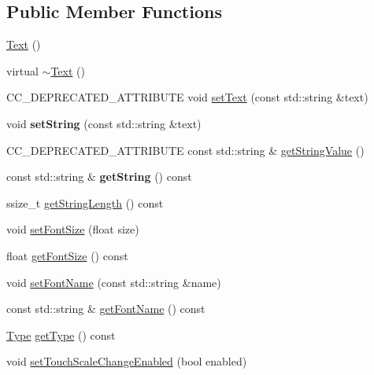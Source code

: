 \subsection*{Public Member Functions}
\begin{DoxyCompactItemize}
\item 
\hyperlink{classui_1_1Text_ab3e26143fccc52699bcc5149cae852bc}{Text} ()
\item 
virtual \hyperlink{classui_1_1Text_a2d49e5c280e205125b149f7777ae30c7}{$\sim$\+Text} ()
\item 
C\+C\+\_\+\+D\+E\+P\+R\+E\+C\+A\+T\+E\+D\+\_\+\+A\+T\+T\+R\+I\+B\+U\+TE void \hyperlink{classui_1_1Text_a2c5da36c598db2803c5fd0a30cc8c7c9}{set\+Text} (const std\+::string \&text)
\item 
\mbox{\label{classui_1_1Text_ad564520019239edbb2785f37e33fb4b6}} 
void {\bfseries set\+String} (const std\+::string \&text)
\item 
C\+C\+\_\+\+D\+E\+P\+R\+E\+C\+A\+T\+E\+D\+\_\+\+A\+T\+T\+R\+I\+B\+U\+TE const std\+::string \& \hyperlink{classui_1_1Text_af96f13417b0e3369f241917a6ea52b9e}{get\+String\+Value} ()
\item 
\mbox{\label{classui_1_1Text_aa1b3ce171bf86d1704f92b6f6daf81ba}} 
const std\+::string \& {\bfseries get\+String} () const
\item 
ssize\+\_\+t \hyperlink{classui_1_1Text_ae73702da851f182ad223f8e091d5a2cf}{get\+String\+Length} () const
\item 
void \hyperlink{classui_1_1Text_ab084a5776c3dd3c7aef1b88b2c06beb6}{set\+Font\+Size} (float size)
\item 
float \hyperlink{classui_1_1Text_a6e799a9b0ba6f88e704eea12599d3d5c}{get\+Font\+Size} () const
\item 
void \hyperlink{classui_1_1Text_ac8fe6b63731d42503f6bb73b00d3d40d}{set\+Font\+Name} (const std\+::string \&name)
\item 
const std\+::string \& \hyperlink{classui_1_1Text_acaddbad02a8d58bba6af322c09e05beb}{get\+Font\+Name} () const
\item 
\hyperlink{classui_1_1Text_a66074a2bf4b155f85115f944c6ff01ed}{Type} \hyperlink{classui_1_1Text_a4f95c69fb9ea4c6f8e0409cc86d804cb}{get\+Type} () const
\item 
void \hyperlink{classui_1_1Text_a4ba60954b699bfcae22d1882c7352348}{set\+Touch\+Scale\+Change\+Enabled} (bool enabled)
\item 

\end{DoxyCompactItemize}
